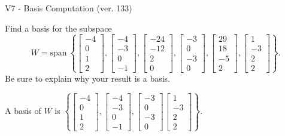 \begin{exercise}
  \begin{exerciseTitle}V7 - Basis Computation (ver. 133)\end{exerciseTitle}
  \begin{exerciseStatement}
    Find a basis for the subspace 
\[W=\mathrm{span}\ \left\{\left[\begin{array}{r}
-4 \\
0 \\
1 \\
2
\end{array}\right] , \left[\begin{array}{r}
-4 \\
-3 \\
0 \\
-1
\end{array}\right] , \left[\begin{array}{r}
-24 \\
-12 \\
2 \\
0
\end{array}\right] , \left[\begin{array}{r}
-3 \\
0 \\
-3 \\
0
\end{array}\right] , \left[\begin{array}{r}
29 \\
18 \\
-5 \\
2
\end{array}\right] , \left[\begin{array}{r}
1 \\
-3 \\
2 \\
2
\end{array}\right]\right\}.\]
 Be sure to explain why your result is a basis.


  \end{exerciseStatement}
  \begin{exerciseAnswer}
   A basis of \(W\) is  \(\left\{\left[\begin{array}{r}
-4 \\
0 \\
1 \\
2
\end{array}\right] , \left[\begin{array}{r}
-4 \\
-3 \\
0 \\
-1
\end{array}\right] , \left[\begin{array}{r}
-3 \\
0 \\
-3 \\
0
\end{array}\right] \left[\begin{array}{r}
1 \\
-3 \\
2 \\
2
\end{array}\right]\right\}\).
  


  \end{exerciseAnswer}
\end{exercise}